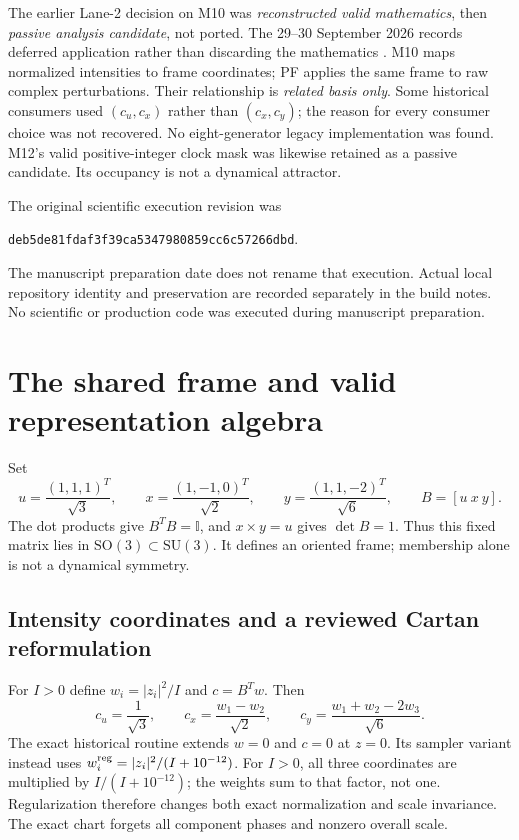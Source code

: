 \documentclass[11pt,a4paper]{article}
\numberwithin{equation}{section}
\newcommand{\I}{\mathbb I}\newcommand{\Argz}{\operatorname{Arg}_0}
\begin{document}
The earlier Lane-2 decision on M10 was \emph{reconstructed valid mathematics}, then \emph{passive analysis candidate}, not ported. The 29--30 September 2026 records deferred application rather than discarding the mathematics \cite{lane}. M10 maps normalized intensities to frame coordinates; PF applies the same frame to raw complex perturbations. Their relationship is \emph{related basis only}. Some historical consumers used $(c_u,c_x)$ rather than $(c_x,c_y)$; the reason for every consumer choice was not recovered. No eight-generator legacy implementation was found. M12's valid positive-integer clock mask was likewise retained as a passive candidate. Its occupancy is not a dynamical attractor.

The original scientific execution revision was
\begin{center}\small\texttt{deb5de81fdaf3f39ca5347980859cc6c57266dbd}.\end{center}
The manuscript preparation date does not rename that execution. Actual local repository identity and preservation are recorded separately in the build notes. No scientific or production code was executed during manuscript preparation.

\section{The shared frame and valid representation algebra}\label{sec:frame}
Set
\begin{equation}\label{eq:frame}
 u=\frac{(1,1,1)^T}{\sqrt3},\qquad x=\frac{(1,-1,0)^T}{\sqrt2},\qquad
 y=\frac{(1,1,-2)^T}{\sqrt6},\qquad B=[u\ x\ y].
\end{equation}
The dot products give $B^TB=\I$, and $x\times y=u$ gives $\det B=1$. Thus this fixed matrix lies in $\mathrm{SO}(3)\subset\mathrm{SU}(3)$. It defines an oriented frame; membership alone is not a dynamical symmetry.

\subsection{Intensity coordinates and a reviewed Cartan reformulation}
For $I>0$ define $w_i=|z_i|^2/I$ and $c=B^Tw$. Then
\begin{equation}\label{eq:intensity}
 c_u=\frac1{\sqrt3},\qquad c_x=\frac{w_1-w_2}{\sqrt2},\qquad
 c_y=\frac{w_1+w_2-2w_3}{\sqrt6}.
\end{equation}
The exact historical routine extends $w=0$ and $c=0$ at $z=0$. Its sampler variant instead uses $w_i^{\rm reg}=|z_i|^2/(I+10^{-12})$. For $I>0$, all three coordinates are multiplied by $I/(I+10^{-12})$; the weights sum to that factor, not one. Regularization therefore changes both exact normalization and scale invariance. The exact chart forgets all component phases and nonzero overall scale.
\end{document}
